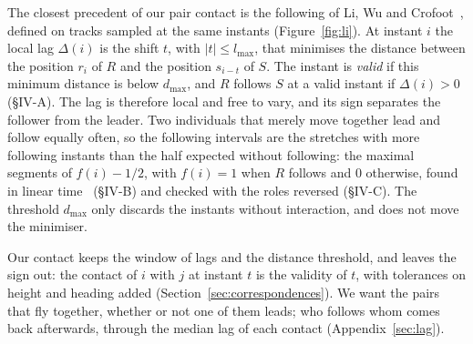 The closest precedent of our pair contact is the following of Li, Wu and Crofoot~\cite{li2013},
defined on tracks sampled at the same instants (Figure~\ref{fig:li}). At instant $i$ the local
lag $\Delta(i)$ is the shift $t$, with $|t|\le l_{\max}$, that minimises the distance between the
position $r_i$ of $R$ and the position $s_{i-t}$ of $S$. The instant is \emph{valid} if this
minimum distance is below $d_{\max}$, and $R$ follows $S$ at a valid instant if $\Delta(i)>0$
(§IV-A). The lag is therefore local and free to vary, and its sign separates the follower from
the leader. Two individuals that merely move together lead and follow equally often, so the
following intervals are the stretches with more following instants than the half expected
without following: the maximal segments of $f(i)-1/2$, with $f(i)=1$ when $R$ follows and $0$
otherwise, found in linear time~\cite{ruzzo1999} (§IV-B) and checked with the roles
reversed (§IV-C). The threshold $d_{\max}$ only discards the instants without interaction, and
does not move the minimiser.

Our contact keeps the window of lags and the distance threshold, and leaves the sign out: the
contact of $i$ with $j$ at instant $t$ is the validity of $t$, with tolerances on height and
heading added (Section~\ref{sec:correspondences}). We want the pairs that fly together, whether
or not one of them leads; who follows whom comes back afterwards, through the median lag of each
contact (Appendix~\ref{sec:lag}).

